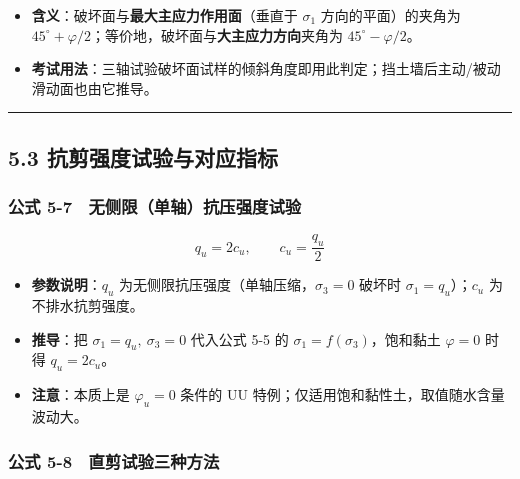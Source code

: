 \documentclass[
]{article}
\providecommand{\tightlist}{%
  \setlength{\itemsep}{0pt}\setlength{\parskip}{0pt}}
\begin{document}
\begin{itemize}
\tightlist
\item
  \textbf{含义}：破坏面与\textbf{最大主应力作用面}（垂直于 \(\sigma_1\)
  方向的平面）的夹角为
  \(45^{\circ}+\varphi/2\)；等价地，破坏面与\textbf{大主应力方向}夹角为
  \(45^{\circ}-\varphi/2\)。
\item
  \textbf{考试用法}：三轴试验破坏面试样的倾斜角度即用此判定；挡土墙后主动/被动滑动面也由它推导。
\end{itemize}

\begin{center}\rule{0.5\linewidth}{0.5pt}\end{center}

\subsection{5.3
抗剪强度试验与对应指标}\label{ux6297ux526aux5f3aux5ea6ux8bd5ux9a8cux4e0eux5bf9ux5e94ux6307ux6807}

\subsubsection{公式
5-7　无侧限（单轴）抗压强度试验}\label{ux516cux5f0f-5-7-ux65e0ux4fa7ux9650ux5355ux8f74ux6297ux538bux5f3aux5ea6ux8bd5ux9a8c}

\[q_u=2c_u,\qquad c_u=\frac{q_u}{2}\]

\begin{itemize}
\tightlist
\item
  \textbf{参数说明}：\(q_u\) 为无侧限抗压强度（单轴压缩，\(\sigma_3=0\)
  破坏时 \(\sigma_1=q_u\)）；\(c_u\) 为不排水抗剪强度。
\item
  \textbf{推导}：把 \(\sigma_1=q_u,\ \sigma_3=0\) 代入公式 5-5 的
  \(\sigma_1=f(\sigma_3)\)，饱和黏土 \(\varphi=0\) 时得 \(q_u=2c_u\)。
\item
  \textbf{注意}：本质上是 \(\varphi_u=0\) 条件的 UU
  特例；仅适用饱和黏性土，取值随水含量波动大。
\end{itemize}

\subsubsection{公式
5-8　直剪试验三种方法}\label{ux516cux5f0f-5-8-ux76f4ux526aux8bd5ux9a8cux4e09ux79cdux65b9ux6cd5}
\end{document}
